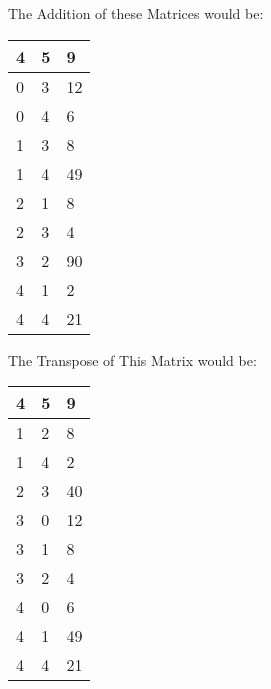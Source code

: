 \documentclass[11pt]{article}
\begin{document}
\begin{enumerate}
	      The Addition of these Matrices would be:

	      \begin{table}[H]
		      \centering
		      \begin{tabular}{|l|l|l|}
			      \hline
			      \textbf{4} & \textbf{5} & \textbf{9} \\ \hline
			      0          & 3          & 12         \\ \hline
			      0          & 4          & 6          \\ \hline
			      1          & 3          & 8          \\ \hline
			      1          & 4          & 49         \\ \hline
			      2          & 1          & 8          \\ \hline
			      2          & 3          & 4          \\ \hline
			      3          & 2          & 90         \\ \hline
			      4          & 1          & 2          \\ \hline
			      4          & 4          & 21         \\ \hline
		      \end{tabular}
	      \end{table}

	      The Transpose of This Matrix would be:
	      \begin{table}[H]
		      \centering
		      \begin{tabular}{|l|l|l|}
			      \hline
			      \textbf{4} & \textbf{5} & \textbf{9} \\ \hline
			      1          & 2          & 8          \\ \hline
			      1          & 4          & 2          \\ \hline
			      2          & 3          & 40         \\ \hline
			      3          & 0          & 12         \\ \hline
			      3          & 1          & 8          \\ \hline
			      3          & 2          & 4          \\ \hline
			      4          & 0          & 6          \\ \hline
			      4          & 1          & 49         \\ \hline
			      4          & 4          & 21         \\ \hline
		      \end{tabular}
	      \end{table}
\end{enumerate}
\end{document}
